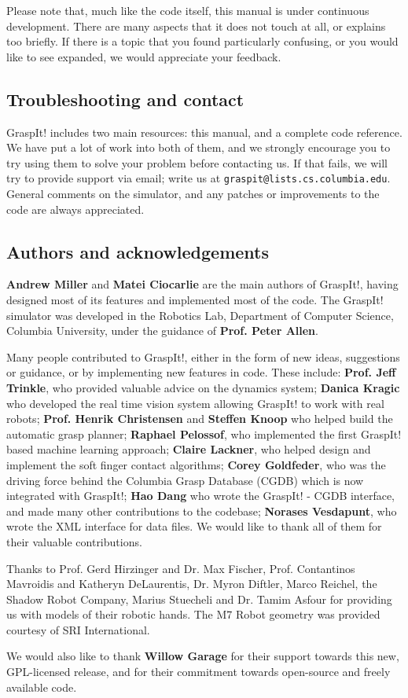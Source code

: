 Please note that, much like the code itself, this manual is under
continuous development. There are many aspects that it does not touch
at all, or explains too briefly. If there is a topic that you found
particularly confusing, or you would like to see expanded, we would
appreciate your feedback.

\subsection{Troubleshooting and contact}

GraspIt! includes two main resources: this manual, and a complete code
reference. We have put a lot of work into both of them, and we
strongly encourage you to try using them to solve your problem before
contacting us. If that fails, we will try to provide support via
email; write us at \texttt{graspit@lists.cs.columbia.edu}. General comments
on the simulator, and any patches or improvements to the code are
always appreciated.

\subsection{Authors and acknowledgements}

\textbf{Andrew Miller} and \textbf{Matei Ciocarlie} are the main
authors of GraspIt!, having designed most of its features and
implemented most of the code. The GraspIt! simulator was developed in
the Robotics Lab, Department of Computer Science, Columbia University,
under the guidance of \textbf{Prof. Peter Allen}.

Many people contributed to GraspIt!, either in the form of new ideas,
suggestions or guidance, or by implementing new features in
code. These include: \textbf{Prof. Jeff Trinkle}, who provided
valuable advice on the dynamics system; \textbf{Danica Kragic} who
developed the real time vision system allowing GraspIt! to work with
real robots; \textbf{Prof. Henrik Christensen} and \textbf{Steffen
  Knoop} who helped build the automatic grasp planner; \textbf{Raphael
  Pelossof}, who implemented the first GraspIt! based machine learning
approach; \textbf{Claire Lackner}, who helped design and implement the
soft finger contact algorithms; \textbf{Corey Goldfeder}, who was the
driving force behind the Columbia Grasp Database (CGDB) which is now
integrated with GraspIt!; \textbf{Hao Dang} who wrote the GraspIt! -
CGDB interface, and made many other contributions to the codebase;
\textbf{Norases Vesdapunt}, who wrote the XML interface for data
files. We would like to thank all of them for their valuable
contributions.

Thanks to Prof. Gerd Hirzinger and Dr. Max Fischer, Prof. Contantinos
Mavroidis and Katheryn DeLaurentis, Dr. Myron Diftler, Marco Reichel,
the Shadow Robot Company, Marius Stuecheli and Dr. Tamim Asfour for
providing us with models of their robotic hands. The M7 Robot geometry
was provided courtesy of SRI International.

We would also like to thank \textbf{Willow Garage} for their support
towards this new, GPL-licensed release, and for their commitment
towards open-source and freely available code.
